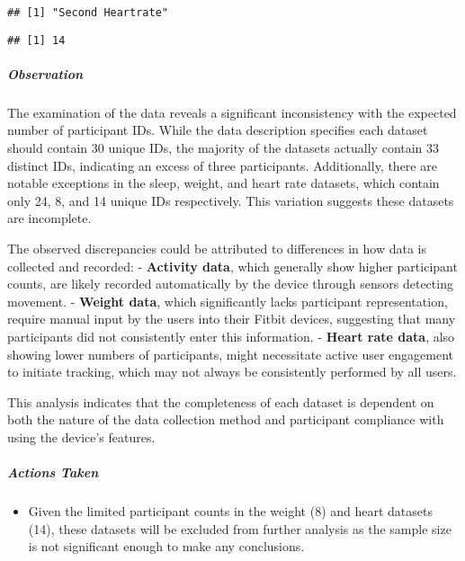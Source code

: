 \documentclass[
]{article}
\newenvironment{Shaded}{\begin{snugshade}}{\end{snugshade}}
\newcommand{\FunctionTok}[1]{\textcolor[rgb]{0.13,0.29,0.53}{\textbf{#1}}}
\newcommand{\NormalTok}[1]{#1}
\newcommand{\SpecialCharTok}[1]{\textcolor[rgb]{0.81,0.36,0.00}{\textbf{#1}}}
\providecommand{\tightlist}{%
  \setlength{\itemsep}{0pt}\setlength{\parskip}{0pt}}
\begin{document}
\begin{verbatim}
## [1] "Second Heartrate"
\end{verbatim}

\begin{Shaded}
\end{Shaded}

\begin{verbatim}
## [1] 14
\end{verbatim}

\hypertarget{observation}{%
\subparagraph{Observation}\label{observation}}

The examination of the data reveals a significant inconsistency with the
expected number of participant IDs. While the data description specifies
each dataset should contain 30 unique IDs, the majority of the datasets
actually contain 33 distinct IDs, indicating an excess of three
participants. Additionally, there are notable exceptions in the sleep,
weight, and heart rate datasets, which contain only 24, 8, and 14 unique
IDs respectively. This variation suggests these datasets are incomplete.

The observed discrepancies could be attributed to differences in how
data is collected and recorded: - \textbf{Activity data}, which
generally show higher participant counts, are likely recorded
automatically by the device through sensors detecting movement. -
\textbf{Weight data}, which significantly lacks participant
representation, require manual input by the users into their Fitbit
devices, suggesting that many participants did not consistently enter
this information. - \textbf{Heart rate data}, also showing lower numbers
of participants, might necessitate active user engagement to initiate
tracking, which may not always be consistently performed by all users.

This analysis indicates that the completeness of each dataset is
dependent on both the nature of the data collection method and
participant compliance with using the device's features.

\hypertarget{actions-taken}{%
\subparagraph{Actions Taken}\label{actions-taken}}

\begin{itemize}
\tightlist
\item
  Given the limited participant counts in the weight (8) and heart
  datasets (14), these datasets will be excluded from further analysis
  as the sample size is not significant enough to make any conclusions.
\end{itemize}
\end{document}
